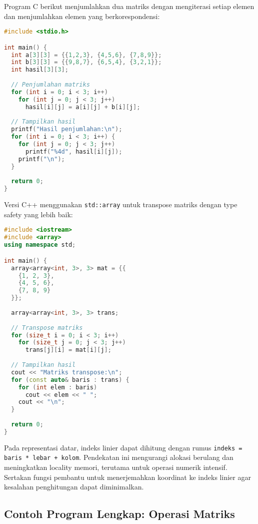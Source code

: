 \documentclass[../main.tex]{subfiles}
\begin{document}
Program C berikut menjumlahkan dua matriks dengan mengiterasi setiap elemen dan menjumlahkan elemen yang berkorespondensi:

\begin{lstlisting}[language=C, caption={Penjumlahan matriks di C}]
#include <stdio.h>

int main() {
  int a[3][3] = {{1,2,3}, {4,5,6}, {7,8,9}};
  int b[3][3] = {{9,8,7}, {6,5,4}, {3,2,1}};
  int hasil[3][3];
  
  // Penjumlahan matriks
  for (int i = 0; i < 3; i++)
    for (int j = 0; j < 3; j++)
      hasil[i][j] = a[i][j] + b[i][j];
  
  // Tampilkan hasil
  printf("Hasil penjumlahan:\n");
  for (int i = 0; i < 3; i++) {
    for (int j = 0; j < 3; j++)
      printf("%4d", hasil[i][j]);
    printf("\n");
  }
  
  return 0;
}
\end{lstlisting}

Versi C++ menggunakan \texttt{std::array} untuk transpose matriks dengan type safety yang lebih baik:

\begin{lstlisting}[language=C++, caption={Operasi matriks di C++}]
#include <iostream>
#include <array>
using namespace std;

int main() {
  array<array<int, 3>, 3> mat = {{
    {1, 2, 3},
    {4, 5, 6},
    {7, 8, 9}
  }};
  
  array<array<int, 3>, 3> trans;
  
  // Transpose matriks
  for (size_t i = 0; i < 3; i++)
    for (size_t j = 0; j < 3; j++)
      trans[j][i] = mat[i][j];
  
  // Tampilkan hasil
  cout << "Matriks transpose:\n";
  for (const auto& baris : trans) {
    for (int elem : baris)
      cout << elem << " ";
    cout << "\n";
  }
  
  return 0;
}
\end{lstlisting}

Pada representasi datar, indeks linier dapat dihitung dengan rumus \texttt{indeks = baris * lebar + kolom}. Pendekatan ini mengurangi alokasi berulang dan meningkatkan locality memori, terutama untuk operasi numerik intensif. Sertakan fungsi pembantu untuk menerjemahkan koordinat ke indeks linier agar kesalahan penghitungan dapat diminimalkan.

\subsection{Contoh Program Lengkap: Operasi Matriks}
\end{document}
